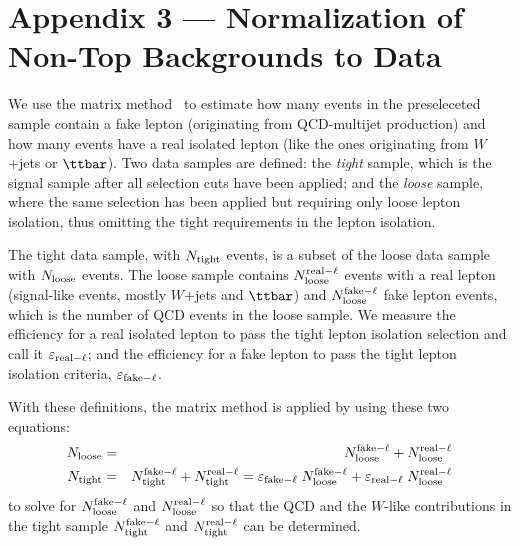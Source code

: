 %

\appendix
\section*{Appendix 3 --- Normalization of Non-Top Backgrounds to Data}
\label{appendix-matrixmethod}

We use the matrix method~\cite{mm_explained} to estimate how many
events in the preseleceted sample contain a fake lepton (originating
from QCD-multijet production) and how many events have a real isolated
lepton (like the ones originating from $W$+jets or $\ttbar$). Two
data samples are defined: the \emph{tight} sample, which is the signal
sample after all selection cuts have been applied; and the
\emph{loose} sample, where the same selection has been applied but
requiring only loose lepton isolation, thus omitting the tight
requirements in the lepton isolation.

The tight data sample, with $N_{{\rm tight}}$ events, is a subset of
the loose data sample with $N_{\rm loose}$ events. The loose sample
contains $N_{\rm loose}^{{\rm real-}\ell}$ events with a real lepton
(signal-like events, mostly $W$+jets and $\ttbar$) and $N_{\rm
loose}^{{\rm fake-}\ell}$ fake lepton events, which is the number of
QCD events in the loose sample. We measure the efficiency for a real
isolated lepton to pass the tight lepton isolation selection and call
it $\varepsilon_{{\rm real-}\ell}$; and the efficiency for a fake
lepton to pass the tight lepton isolation criteria, $\varepsilon_{{\rm
fake-}\ell}$.

With these definitions, the matrix method is applied by using these
two equations:
\begin{eqnarray*}
N_{\rm loose}   & = & N_{\rm loose}^{{\rm fake-}\ell}
                      + N_{\rm loose}^{{\rm real-}\ell} \\
N_{{\rm tight}} & = & N_{{\rm tight}}^{{\rm fake-}\ell}
                      + N_{{\rm tight}}^{{\rm real-}\ell} 
                      = \varepsilon_{{\rm fake-}\ell} \;
                        N_{\rm loose}^{{\rm fake-}\ell}
                      + \varepsilon_{{\rm real-}\ell} \;
                        N_{\rm loose}^{{\rm real-}\ell} 
\end{eqnarray*}
\noindent to solve for $N_{\rm loose}^{{\rm fake-}\ell}$ and $N_{\rm
loose}^{{\rm real-}\ell}$ so that the QCD and the $W$-like
contributions in the tight sample $N_{\rm tight}^{{\rm fake-}\ell}$
and $N_{\rm tight}^{{\rm real-}\ell}$ can be determined.

